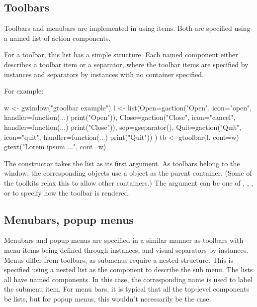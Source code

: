 


\subsection{Toolbars}
\label{sec:gWidgets-toolbars}
Toolbars and menubars are implemented in  using
 items. Both are specified using a named
list of action components. 

For a toolbar, this list has a simple structure. Each named component
either describes a toolbar item or a separator, where the toolbar
items are specified by  instances and separators by
 instances with no container specified.

For example:
\begin{Schunk}
\begin{Sinput}
 w <- gwindow("gtoolbar example")
 l <- list(Open=gaction("Open", icon="open", 
             handler=function(...) print("Open")),
           Close=gaction("Close", icon="cancel", 
             handler=function(...) print("Close")),
           sep=gseparator(),
           Quit=gaction("Quit", icon="quit", 
             handler=function(...) print("Quit"))
           )
 tb <- gtoolbar(l, cont=w)
 gtext("Lorem ipsum ...", cont=w)
\end{Sinput}
\end{Schunk}


The  constructor takes the list as its first
argument.  As toolbars belong to the window, the corresponding
 objects use a  object as the
parent container. (Some of the toolkits relax this to allow other containers.)  The argument
 can be one of , ,
, or  to specify how the toolbar is
rendered. 


\subsection{Menubars, popup menus}
\label{sec:gWidgets-menubars}

Menubars and popup menus are specified in a similar manner as toolbars with menu items
being defined through  instances, and visual separators
by  instances. Menus differ from toolbars, as
submenus require a nested structure. This  is specified using a
nested list as the component to describe the sub menu. The lists all
have named components. In this case, the corresponding name is used to
label the submenu item. For menu bars, it is typical that all the
top-level components be lists, but for popup menus, this wouldn't
necessarily be the case.

